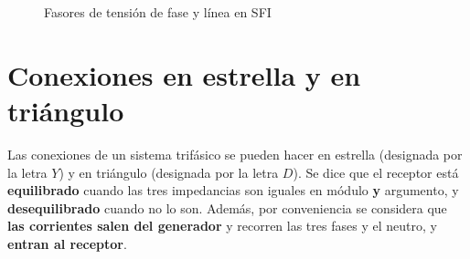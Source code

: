 \documentclass[11pt]{book} %
\begin{document}
	\begin{figure}[htbp]
		\centering
		\hfil
		\caption{Fasores de tensión de fase y línea en SFI}
		\label{fig.linea-fase-SFI}
	\end{figure}
	
	
	
	
	
	
	
	
	\section{Conexiones en estrella y en triángulo}\label{sec.conexiones}
	Las conexiones de un sistema trifásico se pueden hacer en estrella (designada por la letra $Y$) y en triángulo (designada por la letra $D$). Se dice que el receptor está \textbf{equilibrado} cuando las tres impedancias son iguales en módulo \textbf{y} argumento, y \textbf{desequilibrado} cuando no lo son. Además, por conveniencia se considera que \textbf{las corrientes salen del generador} y recorren las tres fases y el neutro, y \textbf{entran al receptor}.
	
\end{document}
